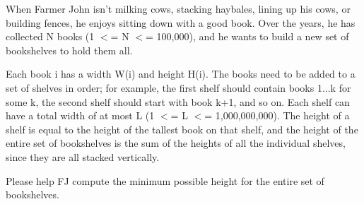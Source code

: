 When Farmer John isn't milking cows, stacking haybales, lining up his cows, or building fences, he enjoys sitting down with a good book.  Over the years, he has collected N books (1 $<$= N $<$= 100,000), and he wants to build a new set of bookshelves to hold them all. 

Each book i has a width W(i) and height H(i).  The books need to be added to a set of shelves in order; for example, the first shelf should contain books 1...k for some k, the second shelf should start with book k+1, and so on.  Each shelf can have a total width of at most L (1 $<$= L $<$= 1,000,000,000).  The height of a shelf is equal to the height of the tallest book on that shelf, and the height of the entire set of bookshelves is the sum of the heights of all the individual shelves, since they are all stacked vertically. 

Please help FJ compute the minimum possible height for the entire set of bookshelves.